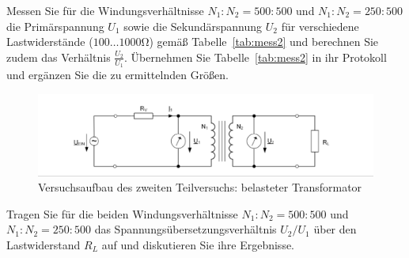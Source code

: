 \documentclass[10pt]{scrreprt}
\begin{document}
        \vspace{0.5cm}

        Messen Sie für die Windungsverhältnisse $N_1 : N_2 = 500 : 500$ und $N_1 : N_2 = 250 : 500$
        die Primärspannung $U_1$ sowie die Sekundärspannung $U_2$ für verschiedene Lastwiderstände
        ($100\ldots1000\si{\ohm}$) gemäß Tabelle~\ref{tab:mess2} und berechnen Sie zudem das Verhältnis $\frac{U_2}{U_1}$.
        Übernehmen Sie Tabelle~\ref{tab:mess2} in ihr Protokoll und ergänzen Sie die zu ermittelnden Größen.

        \begin{center}
            \begin{figure}[H]
                \includegraphics[width=\textwidth]{aufgabenBilder/abbildung9.png}
                \caption{Versuchsaufbau des zweiten Teilversuchs: belasteter Transformator}
                \label{fig:abb9}
            \end{figure}
        \end{center}

        Tragen Sie für die beiden Windungsverhältnisse $N_1 : N_2 = 500 : 500$ und $N_1 : N_2 = 250 : 500$
        das Spannungsübersetzungsverhältnis $U_2 / U_1$ über den Lastwiderstand $R_L$ auf und
        diskutieren Sie ihre Ergebnisse.
\end{document}
